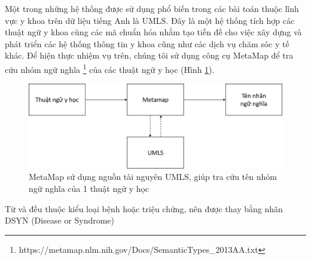 Một trong những hệ thống được sử dụng phổ biến trong các bài toán thuộc lĩnh vực y khoa trên dữ liệu tiếng Anh là UMLS. Đây là một hệ thống tích hợp các thuật ngữ y khoa cùng các mã chuẩn hóa nhằm tạo tiền đề cho việc xây dựng và phát triển các hệ thống thông tin y khoa cũng như các dịch vụ chăm sóc y tế khác. Để hiện thực nhiệm vụ trên, chúng tôi sử dụng công cụ MetaMap để tra cứu nhóm ngữ nghĩa \footnote{https://metamap.nlm.nih.gov/Docs/SemanticTypes\_2013AA.txt} của các thuật ngữ y học (Hình \ref{fig:metamap}).\\
\begin{figure}[H]
\centering
\includegraphics[scale=0.32]{../hinh/metamap.png}
\caption{MetaMap sử dụng nguồn tài nguyên UMLS, giúp tra cứu tên nhóm ngữ nghĩa của 1 thuật ngữ y học}
\label{fig:metamap}
\end{figure}
Từ {} và {} đều thuộc kiểu loại bệnh hoặc triệu chứng, nên được thay bằng nhãn DSYN (Disease or Syndrome)
